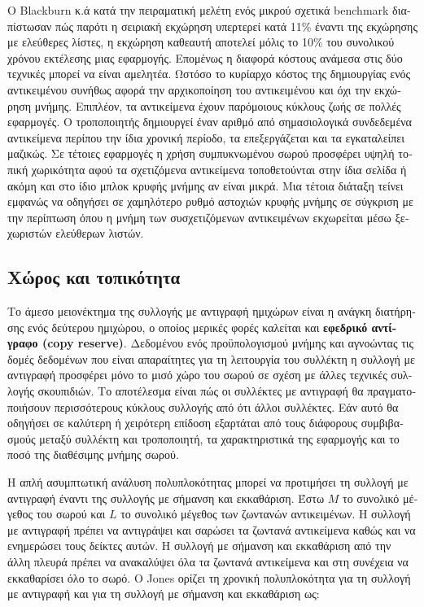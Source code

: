\begin{greek}
Ο Blackburn κ.ά \cite{DBLP:conf/icse/BlackburnCM04} κατά την πειραματική μελέτη ενός
μικρού σχετικά benchmark διαπίστωσαν πώς παρότι η σειριακή
εκχώρηση υπερτερεί κατά 11\% έναντι της εκχώρησης με ελεύθερες
λίστες, η εκχώρηση καθεαυτή αποτελεί μόλις το 10\% του
συνολικού χρόνου εκτέλεσης μιας εφαρμογής. Επομένως η διαφορά
κόστους ανάμεσα στις δύο τεχνικές μπορεί να είναι αμελητέα.
Ωστόσο το κυρίαρχο κόστος της δημιουργίας ενός αντικειμένου 
συνήθως αφορά την αρχικοποίηση του αντικειμένου και όχι την
εκχώρηση μνήμης. Επιπλέον, τα αντικείμενα έχουν παρόμοιους
κύκλους ζωής σε πολλές εφαρμογές. Ο τροποποιητής δημιουργεί
έναν αριθμό από σημασιολογικά συνδεδεμένα αντικείμενα περίπου
την ίδια χρονική περίοδο, τα επεξεργάζεται και τα εγκαταλείπει
μαζικώς. Σε τέτοιες εφαρμογές η χρήση συμπυκνωμένου σωρού
προσφέρει υψηλή τοπική χωρικότητα αφού τα σχετιζόμενα αντικείμενα
τοποθετούνται στην ίδια σελίδα ή ακόμη και στο ίδιο μπλοκ
κρυφής μνήμης αν είναι μικρά. Μια τέτοια διάταξη τείνει
εμφανώς να οδηγήσει σε χαμηλότερο ρυθμό αστοχιών κρυφής
μνήμης σε σύγκριση με την περίπτωση όπου η μνήμη των συσχετιζόμενων
αντικειμένων εκχωρείται μέσω ξεχωριστών ελεύθερων λιστών.

\subsection{Χώρος και τοπικότητα}
Το άμεσο μειονέκτημα της συλλογής με αντιγραφή ημιχώρων είναι
η ανάγκη διατήρησης ενός δεύτερου ημιχώρου, ο οποίος μερικές
φορές καλείται και \textbf{εφεδρικό αντίγραφο (copy reserve)}.
Δεδομένου ενός προϋπολογισμού μνήμης και αγνοώντας τις δομές
δεδομένων που είναι απαραίτητες για τη λειτουργία του συλλέκτη
η συλλογή με αντιγραφή προσφέρει μόνο το μισό χώρο του σωρού
σε σχέση με άλλες τεχνικές συλλογής σκουπιδιών. Το αποτέλεσμα
είναι πώς οι συλλέκτες με αντιγραφή θα πραγματοποιήσουν περισσότερους
κύκλους συλλογής από ότι άλλοι συλλέκτες. Εάν αυτό θα οδηγήσει
σε καλύτερη ή χειρότερη επίδοση εξαρτάται από τους διάφορους
συμβιβασμούς μεταξύ συλλέκτη και τροποποιητή, τα χαρακτηριστικά
της εφαρμογής και το ποσό της διαθέσιμης μνήμης σωρού.

Η απλή ασυμπτωτική ανάλυση πολυπλοκότητας μπορεί να προτιμήσει
τη συλλογή με αντιγραφή έναντι της συλλογής με σήμανση και
εκκαθάριση. Έστω $M$ το συνολικό μέγεθος του σωρού και $L$ το
συνολικό μέγεθος των ζωντανών αντικειμένων. Η συλλογή με αντιγραφή
πρέπει να αντιγράψει και σαρώσει τα ζωντανά αντικείμενα καθώς
και να ενημερώσει τους δείκτες αυτών. Η συλλογή με σήμανση και
εκκαθάριση από την άλλη πλευρά πρέπει να ανακαλύψει όλα τα ζωντανά
αντικείμενα και στη συνέχεια να εκκαθαρίσει όλο το σωρό.
Ο Jones \cite{DBLP:books/wi/JonesL96} ορίζει τη χρονική πολυπλοκότητα για τη συλλογή
με αντιγραφή και για τη συλλογή με σήμανση και εκκαθάριση ως:


\end{greek}
